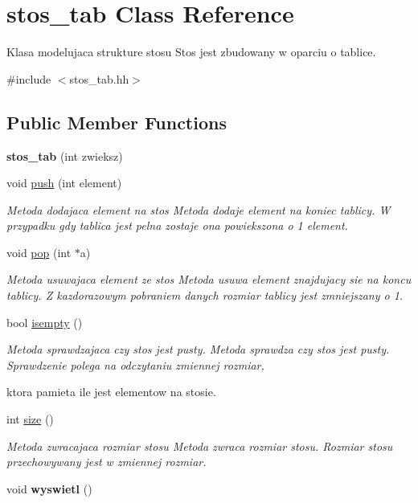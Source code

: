 \hypertarget{classstos__tab}{\section{stos\-\_\-tab Class Reference}
\label{classstos__tab}
}


Klasa modelujaca strukture stosu Stos jest zbudowany w oparciu o tablice.  




{\ttfamily \#include $<$stos\-\_\-tab.\-hh$>$}

\subsection*{Public Member Functions}
\begin{DoxyCompactItemize}
\item 
\hypertarget{classstos__tab_a57087c3536dd95373d29687bc67add5b}{{\bfseries stos\-\_\-tab} (int zwieksz)}\label{classstos__tab_a57087c3536dd95373d29687bc67add5b}

\item 
void \hyperlink{classstos__tab_a9a71759b07b389be638f5d30184abfbb}{push} (int element)
\begin{DoxyCompactList}\small\item\em Metoda dodajaca element na stos Metoda dodaje element na koniec tablicy. W przypadku gdy tablica jest pelna zostaje ona powiekszona o 1 element. \end{DoxyCompactList}\item 
void \hyperlink{classstos__tab_ac712f40774c01e8172e55d0a84d6556b}{pop} (int $\ast$a)
\begin{DoxyCompactList}\small\item\em Metoda usuwajaca element ze stos Metoda usuwa element znajdujacy sie na koncu tablicy. Z kazdorazowym pobraniem danych rozmiar tablicy jest zmniejszany o 1. \end{DoxyCompactList}\item 
bool \hyperlink{classstos__tab_ae330da440974774718d3c268b951ffae}{isempty} ()
\begin{DoxyCompactList}\small\item\em Metoda sprawdzajaca czy stos jest pusty. Metoda sprawdza czy stos jest pusty. Sprawdzenie polega na odczytaniu zmiennej rozmiar, \par
 ktora pamieta ile jest elementow na stosie. \end{DoxyCompactList}\item 
int \hyperlink{classstos__tab_a424bfe5bdc7bc7a70bd1209052ec4de9}{size} ()
\begin{DoxyCompactList}\small\item\em Metoda zwracajaca rozmiar stosu Metoda zwraca rozmiar stosu. Rozmiar stosu przechowywany jest w zmiennej rozmiar. \end{DoxyCompactList}\item 
\hypertarget{classstos__tab_a86c345d9cbe2aaf711e188c2132b64e0}{void {\bfseries wyswietl} ()}\label{classstos__tab_a86c345d9cbe2aaf711e188c2132b64e0}

\end{DoxyCompactItemize}


